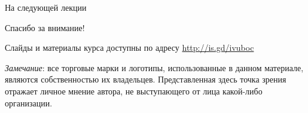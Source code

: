 \documentclass{beamer}
\begin{document}
\begin{frame}{На следующей лекции}
\centering

\end{frame}


\begin{frame}

{\huge{Спасибо за внимание!}\par}

\vfill

Слайды и материалы курса доступны по адресу \url{http://is.gd/ivuboc} %

\vfill

\tiny{\textit{Замечание}: все торговые марки и логотипы, использованные в данном материале, являются собственностью их владельцев. Представленная здесь точка зрения отражает личное мнение автора, не выступающего от лица какой-либо организации.}

\end{frame}
\end{document}
